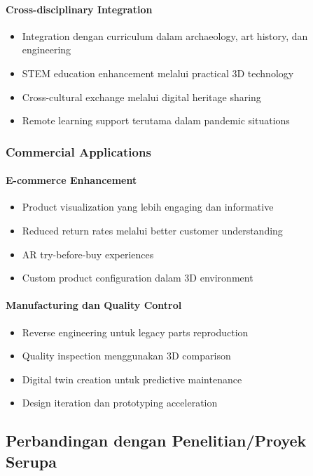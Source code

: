 \documentclass[12pt,a4paper]{article}
\begin{document}
\paragraph{Cross-disciplinary Integration}
\begin{itemize}
    \item Integration dengan curriculum dalam archaeology, art history, dan engineering
    \item STEM education enhancement melalui practical 3D technology
    \item Cross-cultural exchange melalui digital heritage sharing
    \item Remote learning support terutama dalam pandemic situations
\end{itemize}

\subsubsection{Commercial Applications}

\paragraph{E-commerce Enhancement}
\begin{itemize}
    \item Product visualization yang lebih engaging dan informative
    \item Reduced return rates melalui better customer understanding
    \item AR try-before-buy experiences
    \item Custom product configuration dalam 3D environment
\end{itemize}

\paragraph{Manufacturing dan Quality Control}
\begin{itemize}
    \item Reverse engineering untuk legacy parts reproduction
    \item Quality inspection menggunakan 3D comparison
    \item Digital twin creation untuk predictive maintenance
    \item Design iteration dan prototyping acceleration
\end{itemize}

\subsection{Perbandingan dengan Penelitian/Proyek Serupa}
\end{document}
